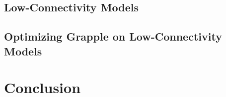 \documentclass[
fancyheadings, %
%
%
]{stsreprt}
\begin{document}
\section{Low-Connectivity Models}


\section{Optimizing Grapple on Low-Connectivity Models}


\chapter{Conclusion}



\backmatter

\printbibliography[heading=bibintoc]
\end{document}
